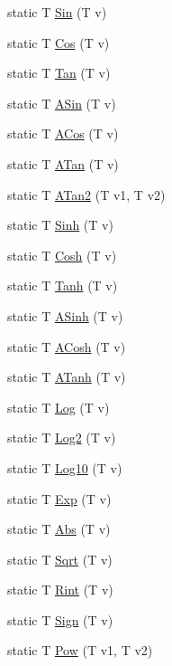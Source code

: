 \begin{DoxyCompactItemize}
\item 
static T \hyperlink{structmu_1_1_math_impl_a99e3fc1b9619b53c3c544d430c5eaf57}{Sin} (T v)
\item 
static T \hyperlink{structmu_1_1_math_impl_a8bb2e5d6cc53bf29dff76539db2689ec}{Cos} (T v)
\item 
static T \hyperlink{structmu_1_1_math_impl_a1178975495a4ea5ce610f7f2db9d2c15}{Tan} (T v)
\item 
static T \hyperlink{structmu_1_1_math_impl_a661805db02d0613b6b9a41c9fe4e864f}{A\+Sin} (T v)
\item 
static T \hyperlink{structmu_1_1_math_impl_abc33fc3bf395acbf8dad36cd96b2e55a}{A\+Cos} (T v)
\item 
static T \hyperlink{structmu_1_1_math_impl_a41b701834e2e4fbee78739e0d27e786d}{A\+Tan} (T v)
\item 
static T \hyperlink{structmu_1_1_math_impl_aebc8ca92f9ecff0504ae2feb81aa7c52}{A\+Tan2} (T v1, T v2)
\item 
static T \hyperlink{structmu_1_1_math_impl_aae5ae2f9fb6c7c5eec87f06cb7d8e77f}{Sinh} (T v)
\item 
static T \hyperlink{structmu_1_1_math_impl_a8e7d4d97eb32cd68247a8edbe8859873}{Cosh} (T v)
\item 
static T \hyperlink{structmu_1_1_math_impl_aaad1a25bf8f1b6c4aac5685b04e9afb3}{Tanh} (T v)
\item 
static T \hyperlink{structmu_1_1_math_impl_a0bc5346ae5066e6cddca5deee1033595}{A\+Sinh} (T v)
\item 
static T \hyperlink{structmu_1_1_math_impl_a3e8b1907f6126ab31f0d0b72b84fc747}{A\+Cosh} (T v)
\item 
static T \hyperlink{structmu_1_1_math_impl_a3c07bdfdcb31027b4bee750504be94b7}{A\+Tanh} (T v)
\item 
static T \hyperlink{structmu_1_1_math_impl_aa5017afe7626eed91a04dd2ef8c352dd}{Log} (T v)
\item 
static T \hyperlink{structmu_1_1_math_impl_a51fae1af1e5ddcb9662fa1679bd200a2}{Log2} (T v)
\item 
static T \hyperlink{structmu_1_1_math_impl_aa90a67a91bde6f61905914db7c0c5f5b}{Log10} (T v)
\item 
static T \hyperlink{structmu_1_1_math_impl_a0ea44e0086e10c103c8ea29444f79ba7}{Exp} (T v)
\item 
static T \hyperlink{structmu_1_1_math_impl_a9c353404e8e47a546307397eca4555ab}{Abs} (T v)
\item 
static T \hyperlink{structmu_1_1_math_impl_aa352cccdfd42b462928dda69d1b0bd83}{Sqrt} (T v)
\item 
static T \hyperlink{structmu_1_1_math_impl_a0fe3c35ade419db4cc7a3dc02b7d2a89}{Rint} (T v)
\item 
static T \hyperlink{structmu_1_1_math_impl_a11aeb28ee6b9bd7c617da3fd4cdd25e7}{Sign} (T v)
\item 
static T \hyperlink{structmu_1_1_math_impl_a51336cadb47f16536a578eb11d2b015c}{Pow} (T v1, T v2)
\end{DoxyCompactItemize}



